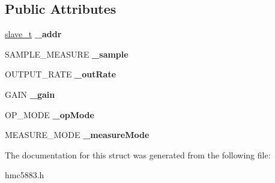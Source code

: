 \subsection*{Public Attributes}
\begin{DoxyCompactItemize}
\item 
\mbox{\label{structhmc5883__t_a78fcab12d61314413e2000223c8acc9b}} 
\hyperlink{structslave__t}{slave\+\_\+t} {\bfseries \+\_\+addr}
\item 
\mbox{\label{structhmc5883__t_a5d6bda3e7c498f9338bf60d4eb0676f1}} 
S\+A\+M\+P\+L\+E\+\_\+\+M\+E\+A\+S\+U\+RE {\bfseries \+\_\+sample}
\item 
\mbox{\label{structhmc5883__t_abdd992bb7c065497ba272dff4bd5b5fc}} 
O\+U\+T\+P\+U\+T\+\_\+\+R\+A\+TE {\bfseries \+\_\+out\+Rate}
\item 
\mbox{\label{structhmc5883__t_adafec64b6dd1f3fab546d3af997ccd0e}} 
G\+A\+IN {\bfseries \+\_\+gain}
\item 
\mbox{\label{structhmc5883__t_ae5ae94558f6f65fc5bfda7c3cd23c0da}} 
O\+P\+\_\+\+M\+O\+DE {\bfseries \+\_\+op\+Mode}
\item 
\mbox{\label{structhmc5883__t_ab81da8b66db5c81e2d5104b018cca68d}} 
M\+E\+A\+S\+U\+R\+E\+\_\+\+M\+O\+DE {\bfseries \+\_\+measure\+Mode}
\end{DoxyCompactItemize}


The documentation for this struct was generated from the following file\+:\begin{DoxyCompactItemize}
\item 
hmc5883.\+h\end{DoxyCompactItemize}
